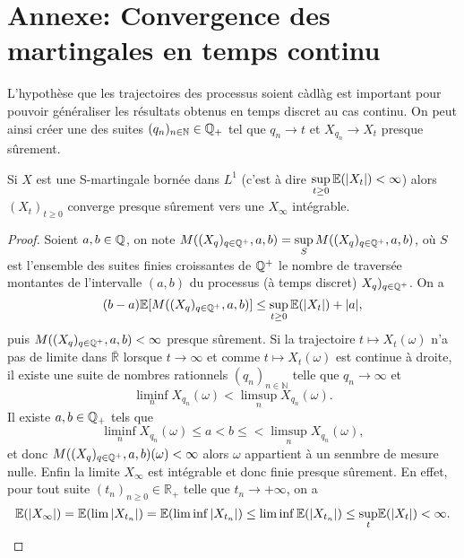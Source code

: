 \section{Annexe: Convergence des martingales en temps continu}\label{app:convergence_martingale_continu}
L'hypothèse que les trajectoires des processus soient càdlàg est important pour pouvoir généraliser les résultats obtenus en temps discret au cas continu. On peut ainsi créer une des suites $(q_n)_{n\in\mathbb{N}}\in \mathbb{Q}_+$ tel que $q_n\rightarrow t$ et $X_{q_n}\rightarrow X_t$ presque sûrement. 
\begin{theo}
Si $X$ est une S-martingale bornée dans $L^1$ (c'est à dire $\underset{t\geq0}{\sup}\,\mathbb{E}(|X_t|)<\infty$) alors $(X_t)_{t\geq 0}$ converge presque sûrement vers une \va $X_\infty$ intégrable.
\end{theo}
\begin{proof}
Soient $a,b\in \mathbb{Q}$, on note $M((X_{q})_{q\in \mathbb{Q}^+}, a, b) = \underset{S}{\sup}\, M((X_{q})_{q\in \mathbb{Q}^+}, a, b)$, où $S$ est l'ensemble des suites finies croissantes de $\mathbb{Q}^+$ le nombre de traversée montantes de l'intervalle $(a,b)$ du processus (à temps discret) $X_{q})_{q\in \mathbb{Q}^+}$. On a 
$$
(b-a)\mathbb{E}[M((X_{q})_{q\in \mathbb{Q}^+}, a, b)]\leq \underset{t\geq 0}{\sup}\,\mathbb{E}(|X_t|) + |a|, 
$$
puis $M((X_{q})_{q\in \mathbb{Q}^+}, a, b)<\infty$ presque sûrement. Si la trajectoire $t\mapsto X_t(\omega)$  n'a pas de limite dans $\bar{\mathbb{R}}$ lorsque $t\rightarrow \infty$ et comme $t\mapsto X_t(\omega)$ est continue à droite, il existe une suite de nombres rationnels $(q_n)_{n\in\mathbb{N}}$ telle que $q_n\rightarrow \infty$ et 
$$
\underset{n}{\liminf} X_{q_n}(\omega) <\underset{n}{\limsup} X_{q_n}(\omega).
$$
Il existe $a,b\in\mathbb{Q}_+$ tels que 
$$
\underset{n}{\liminf} X_{q_n}(\omega) \leq a<b\leq<\underset{n}{\limsup} X_{q_n}(\omega), 
$$
et donc $M((X_{q})_{q\in \mathbb{Q}^+}, a, b)(\omega)<\infty$ alors $\omega$ appartient à un senmbre de mesure nulle. Enfin la limite $X_\infty$ est intégrable et donc finie presque sûrement. En effet, pour tout suite $(t_n)_{n\geq 0}\in\mathbb{R}_+$ telle que $t_n\rightarrow +\infty$, on a 
$$
\mathbb{E}(|X_\infty|) =\mathbb{E}(\lim |X_{t_n}|) = \mathbb{E}(\liminf |X_{t_n}|)\leq \liminf\mathbb{E}( |X_{t_n}|)\leq \underset{t}{\sup}\mathbb{E}(|X_t|) <\infty.
$$
\end{proof}




\newpage